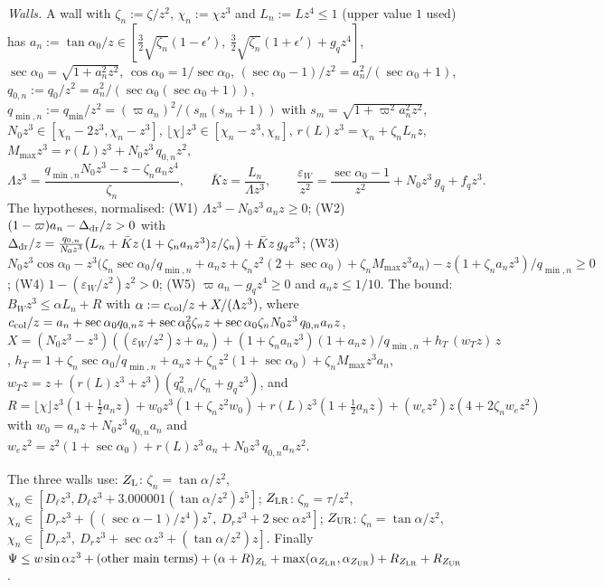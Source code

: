 \documentclass[11pt]{amsart}
\newcommand{\sa}{\sin\alpha}
\newcommand{\ta}{\tan\alpha}
\newcommand{\se}{\sec\alpha}
\newcommand{\caz}{\cos\alpha_0}
\newcommand{\taz}{\tan\alpha_0}
\newcommand{\sez}{\sec\alpha_0}
\newcommand{\Kb}{\bar K}
\theoremstyle{definition}
\theoremstyle{remark}
\numberwithin{equation}{section}
\begin{document}
\emph{Walls.} A wall with $\zeta_n:=\zeta/z^2$, $\chi_n:=\chi z^3$ and $L_n:=Lz^4\le1$ (upper value $1$ used) has
$a_n:=\taz/z\in[\frac32\sqrt{\zeta_n}(1-\epsilon'),\ \frac32\sqrt{\zeta_n}(1+\epsilon')+g_qz^4]$,
$\sez=\sqrt{1+a_n^2z^2}$, $\caz=1/\sez$, $(\sez-1)/z^2=a_n^2/(\sez+1)$, $q_{0,n}:=q_0/z^2=a_n^2/(\sez(\sez+1))$,
$q_{\min,n}:=q_{\min}/z^2=(\varpi a_n)^2/(s_m(s_m+1))$ with $s_m=\sqrt{1+\varpi^2a_n^2z^2}$, $N_0z^3\in[\chi_n-2z^3,\chi_n-z^3]$,
$\lfloor\chi\rfloor z^3\in[\chi_n-z^3,\chi_n]$, $r(L)z^3=\chi_n+\zeta_nL_nz$, $M_{\max}z^3=r(L)z^3+N_0z^3\,q_{0,n}z^2$,
\[
\Lambda z^3=\frac{q_{\min,n}N_0z^3-z-\zeta_na_nz^4}{\zeta_n},\qquad \Kb z=\frac{L_n}{\Lambda z^3},\qquad
\frac{\varepsilon_W}{z^2}=\frac{\sez-1}{z^2}+N_0z^3\,g_q+f_qz^3 .
\]
The hypotheses, normalised: (W1) $\Lambda z^3-N_0z^3\,a_nz\ge0$;
(W2) $(1-\varpi)a_n-\Delta_{\rm dr}/z>0$ with $\Delta_{\rm dr}/z=\frac{q_{0,n}}{N_0z^3}\bigl(L_n+\Kb z\,(1+\zeta_na_nz^3)z/\zeta_n\bigr)
+\Kb z\,g_qz^3$;
(W3) $N_0z^3\caz-z^3\bigl(\zeta_n\sez/q_{\min,n}+a_nz+\zeta_nz^2(2+\sez)+\zeta_nM_{\max}z^3a_n\bigr)-z(1+\zeta_na_nz^3)/q_{\min,n}\ge0$;
(W4) $1-(\varepsilon_W/z^2)z^2>0$; (W5) $\varpi a_n-g_qz^4\ge0$ and $a_nz\le1/10$.
The bound: $B_Wz^3\le\alpha L_n+R$ with
$\alpha:=c_{\rm col}/z+X/(\Lambda z^3)$, where
$c_{\rm col}/z=a_n+\sez q_{0,n}z+\sez^2\zeta_nz+\sez\zeta_nN_0z^3\,q_{0,n}a_nz$,
$X=(N_0z^3-z^3)((\varepsilon_W/z^2)z+a_n)+(1+\zeta_na_nz^3)(1+a_nz)/q_{\min,n}+h_T\,(w_Tz)\,z$,
$h_T=1+\zeta_n\sez/q_{\min,n}+a_nz+\zeta_nz^2(1+\sez)+\zeta_nM_{\max}z^3a_n$,
$w_Tz=z+(r(L)z^3+z^3)(q_{0,n}^2/\zeta_n+g_qz^3)$, and
$R=\lfloor\chi\rfloor z^3(1+\frac12a_nz)+w_0z^3(1+\zeta_nz^2w_0)+r(L)z^3(1+\frac12a_nz)+(w_ez^2)z(4+2\zeta_nw_ez^2)$
with $w_0=a_nz+N_0z^3\,q_{0,n}a_n$ and $w_ez^2=z^2(1+\sez)+r(L)z^3\,a_n+N_0z^3\,q_{0,n}a_nz^2$.

The three walls use: $Z_{\rm L}$: $\zeta_n=\ta/z^2$, $\chi_n\in[D_\ell z^3,D_\ell z^3+3.000001(\ta/z^2)z^5]$;
$Z_{\rm LR}$: $\zeta_n=\tau/z^2$, $\chi_n\in[D_rz^3+((\se-1)/z^4)z^7,\ D_rz^3+2\se z^3]$; $Z_{\rm UR}$: $\zeta_n=\ta/z^2$,
$\chi_n\in[D_rz^3,\ D_rz^3+\se z^3+(\ta/z^2)z]$. Finally
$\Psi\le w\sa z^3+(\text{other main terms})+(\alpha+R)_{Z_{\rm L}}+\max(\alpha_{Z_{\rm LR}},\alpha_{Z_{\rm UR}})+R_{Z_{\rm LR}}+R_{Z_{\rm UR}}$.
\end{document}

